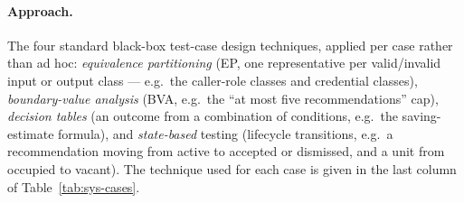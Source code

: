 \paragraph{Approach.} The four standard black-box test-case design techniques,
applied per case rather than ad hoc: \emph{equivalence partitioning} (EP, one
representative per valid/invalid input or output class --- e.g.\ the caller-role
classes and credential classes), \emph{boundary-value analysis} (BVA, e.g.\ the
``at most five recommendations'' cap), \emph{decision tables} (an outcome from a
combination of conditions, e.g.\ the saving-estimate formula), and
\emph{state-based} testing (lifecycle transitions, e.g.\ a recommendation moving
from active to accepted or dismissed, and a unit from occupied to vacant). The
technique used for each case is given in the last column of
Table~\ref{tab:sys-cases}.

